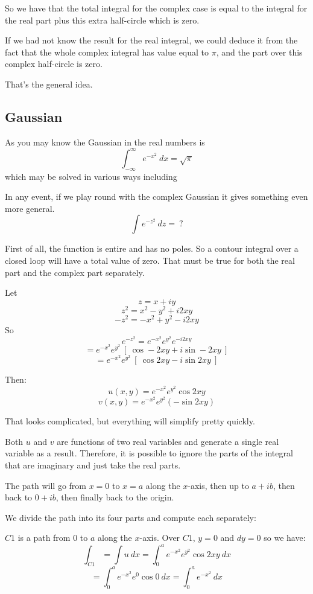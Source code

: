 \documentclass[11pt, oneside]{article}
\begin{document}
So we have that the total integral for the complex case is equal to the integral for the real part plus this extra half-circle which is zero.

If we had not know the result for the real integral, we could deduce it from the fact that the whole complex integral has value equal to $\pi$, and the part over this complex half-circle is zero.

That's the general idea.

\subsection*{Gaussian}

As you may know the Gaussian in the real numbers is
\[ \int_{-\infty}^{\infty} e^{-x^2} \ dx = \sqrt{\pi} \]
which may be solved in various ways including 

In any event, if we play round with the complex Gaussian it gives something even more general.
\[ \int e^{-z^2} \ dz = \ ? \]

First of all, the function is entire and has no poles.  So a contour integral over a closed loop will have a total value of zero.  That must be true for both the real part and the complex part separately.

Let 
\[ z = x + iy \]
\[ z^2 = x^2 - y^2 + i2xy \]
\[ -z^2 = -x^2 + y^2 - i2xy \]
So
\[ e^{-z^2} = e^{-x^2} e^{y^2} e^{-i2xy} \]
\[ = e^{-x^2} e^{y^2} \ [ \ \cos -2xy + i \sin -2xy \ ] \]
\[ = e^{-x^2} e^{y^2} \ [ \ \cos 2xy - i \sin 2xy \ ] \]

Then:
\[ u(x,y) =  e^{-x^2} e^{y^2} \cos 2xy \]
\[ v(x,y) = e^{-x^2} e^{y^2} (- \sin 2xy) \]

That looks complicated, but everything will simplify pretty quickly.

Both $u$ and $v$ are functions of two real variables and generate a single real variable as a result.  Therefore, it is possible to ignore the parts of the integral that are imaginary and just take the real parts.

The path will go from $x = 0$ to $x = a$ along the $x$-axis, then up to $a + ib$, then back to $0 + ib$, then finally back to the origin.

We divide the path into its four parts and compute each separately:

$C1$ is a path from $0$ to $a$ along the $x$-axis.  Over $C1$, $y=0$ and $dy = 0$ so we have:
\[ \int_{C1} = \int u \ dx  = \int_0^a e^{-x^2} e^{y^2} \cos 2xy \ dx\]
\[ = \int_0^a e^{-x^2} e^{0} \cos 0 \ dx = \int_0^a e^{-x^2} \ dx \]
\end{document}
